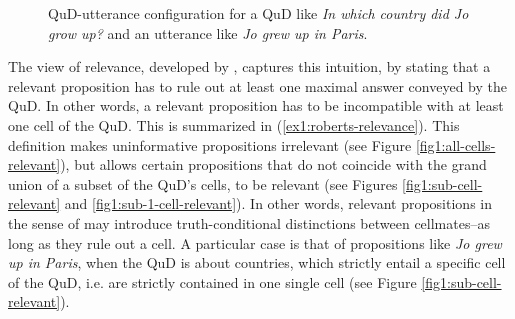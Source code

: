 \begin{figure}[H]
	\centering
	\caption{QuD-utterance configuration for a QuD like \textit{In which country did Jo grow up?} and an utterance like \textit{Jo grew up in Paris}.}\label{fig1:relevance-example-2}
\end{figure}

The view of relevance, developed by \citet{Roberts2012}, captures this intuition, by stating that a relevant proposition has to rule out at least one maximal answer conveyed by the QuD. In other words, a relevant proposition has to be incompatible with at least one cell of the QuD. This is summarized in (\ref{ex1:roberts-relevance}). This definition makes uninformative propositions irrelevant (see Figure \ref{fig1:all-cells-relevant}), but allows certain propositions that do not coincide with the grand union of a subset of the QuD's cells, to be relevant (see Figures \ref{fig1:sub-cell-relevant} and \ref{fig1:sub-1-cell-relevant}). In other words, relevant propositions in the sense of \citeauthor{Roberts2012} may introduce truth-conditional distinctions between cellmates--as long as they rule out a cell. A particular case is that of propositions like \textit{Jo grew up in Paris}, when the QuD is about countries, which strictly entail a specific cell of the QuD, i.e. are strictly contained in one single cell (see Figure \ref{fig1:sub-cell-relevant}).

\begin{exe}
	\label{ex1:roberts-relevance}
\end{exe}

